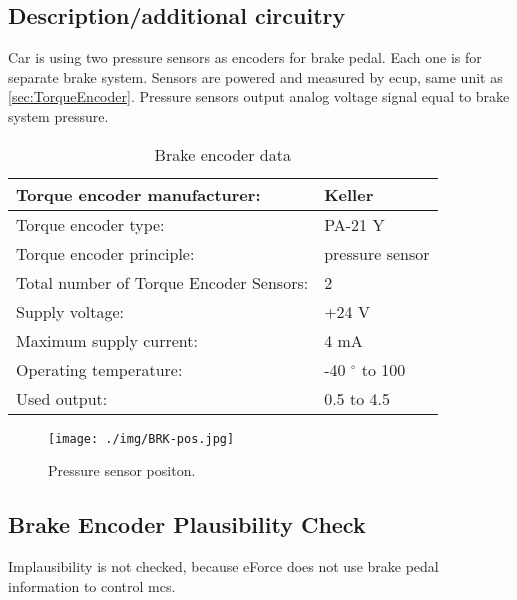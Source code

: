 \subsection{Description/additional circuitry}
Car is using two pressure sensors as encoders for brake pedal. Each one is for separate brake system. Sensors are powered and measured by \gls{ecup}, same unit as \ref{sec:TorqueEncoder}. Pressure sensors output analog voltage signal equal to brake system pressure. 


\begin{table}[H]
	\centering
	\caption{Brake encoder data}
	\begin{tabu}{|X|X|}
		\hline
		Torque encoder manufacturer: &  Keller \\\hline
		Torque encoder type: & PA-21 Y \\\hline
		Torque encoder principle: & pressure sensor \\\hline
		Total number of Torque Encoder Sensors: & 2 \\\hline
		Supply voltage: & +24 V \\\hline
		Maximum supply current: &  4 mA  \\\hline
		Operating temperature: & -40 $^\circ$ to 100 \degC \\\hline
		Used output: & 0.5 \vdc to 4.5 \vdc \\\hline
	\end{tabu}%
	\label{tab:brake-general}%
\end{table}%

\begin{figure}[H]
	\begin{center}
		\texttt{[image: ./img/BRK-pos.jpg]}
		\caption{Pressure sensor positon.}
		\label{fig:brake_pressure_position}
	\end{center}
\end{figure}

\subsection{Brake Encoder Plausibility Check}
Implausibility is not checked, because eForce does not use brake pedal information to control \glspl{mc}.

%
%





